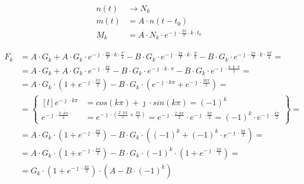 \begin{task}
\begin{align*}
n(t)&\rightarrow N_k\\
m(t) &= A \cdot n(t-t_0)\\
M_k &= A \cdot N_k \cdot e^{-\jmath \cdot \frac{2\pi}{T}\cdot k\cdot t_0}
\end{align*}


\begin{align*}
F_k&= A \cdot G_k + A \cdot G_k \cdot e^{-\jmath \cdot \frac{2\pi}{T}\cdot k\cdot \frac{T}{4}} - B \cdot G_k \cdot e^{-\jmath \cdot \frac{2\pi}{T}\cdot k\cdot \frac{T}{2}} - B \cdot G_k \cdot e^{-\jmath \cdot \frac{2\pi}{T}\cdot k\cdot \frac{3T}{4}}=\\
&= A \cdot G_k + A \cdot G_k \cdot e^{-\jmath \cdot \frac{k\pi}{2}} - B \cdot G_k \cdot e^{-\jmath \cdot k \cdot \pi} - B \cdot G_k \cdot e^{-\jmath \cdot \frac{3 \cdot k \cdot \pi}{2}}=\\
&= A \cdot G_k \cdot \left(1+ e^{-\jmath \cdot \frac{k\pi}{2}}\right) - B \cdot G_k \cdot \left(e^{-\jmath \cdot k\pi} + e^{-\jmath \cdot \frac{3k\pi}{2}}\right)=\\
&=\begin{Bmatrix*}[l]
e^{-\jmath \cdot k\pi} &= cos\left(k\pi\right) +\jmath \cdot sin\left(k\pi\right) = (-1)^k\\
e^{-\jmath \cdot \frac{3 \cdot k\pi}{2}}  &= e^{-\jmath \cdot \left(\frac{2 \cdot k\pi}{2}+\frac{k\pi}{2}\right)}= e^{-\jmath \cdot \frac{2 \cdot k\pi}{2}} \cdot e^{-\jmath \cdot \frac{k\pi}{2}}= (-1)^k \cdot e^{-\jmath \cdot \frac{k\pi}{2}}
\end{Bmatrix*}=\\
&= A \cdot G_k \cdot \left(1+ e^{-\jmath \cdot \frac{k\pi}{2}}\right) - B \cdot G_k \cdot \left((-1)^k+(-1)^k \cdot e^{-\jmath \cdot \frac{k\pi}{2}}\right)=\\
&= A \cdot G_k \cdot \left(1+ e^{-\jmath \cdot \frac{k\pi}{2}}\right) -  B \cdot G_k \cdot (-1)^k \cdot \left(1+ e^{-\jmath \cdot \frac{k\pi}{2}}\right)=\\
&= G_k \cdot \left(1+ e^{-\jmath \cdot \frac{k\pi}{2}}\right) \cdot \left(A - B \cdot (-1)^k\right)\\
\end{align*}



\end{task}

